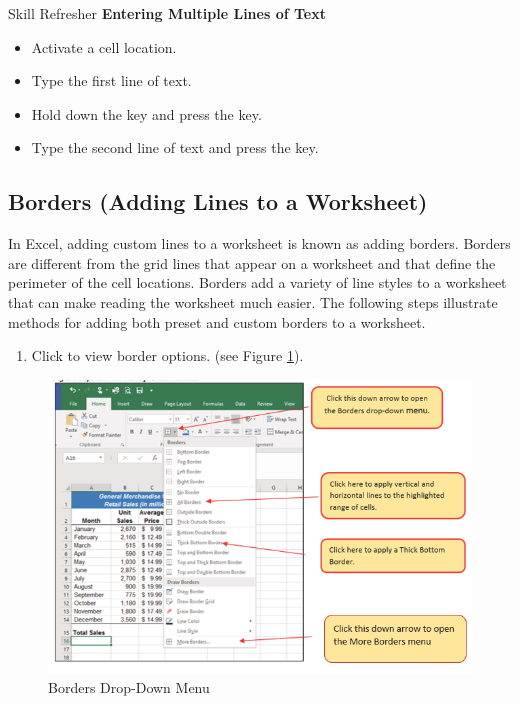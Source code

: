 \begin{center}
	\begin{sklbox}{Skill Refresher}
		\textbf{Entering Multiple Lines of Text}
		\\
		\begin{itemize}
			\setlength{\itemsep}{0pt}
			\setlength{\parskip}{0pt}
			\setlength{\parsep}{0pt}
			
			\item Activate a cell location.
			\item Type the first line of text.
			\item Hold down the  key and press the  key.
			\item Type the second line of text and press the  key.
			
		\end{itemize}
	\end{sklbox}
\end{center}

\subsection{Borders (Adding Lines to a Worksheet)}

In Excel, adding custom lines to a worksheet is known as adding borders. Borders are different from the grid lines that appear on a worksheet and that define the perimeter of the cell locations. Borders add a variety of line styles to a worksheet that can make reading the worksheet much easier. The following steps illustrate methods for adding both preset and custom borders to a worksheet.

\begin{enumerate}
	\item Click  to view border options. (see Figure \ref{01:fig42}).
\end{enumerate}

\begin{figure}[H]
	\centering
	\includegraphics[width=\maxwidth{.95\linewidth}]{gfx/ch01_fig42}
	\caption{Borders Drop-Down Menu}
	\label{01:fig42}
\end{figure}

